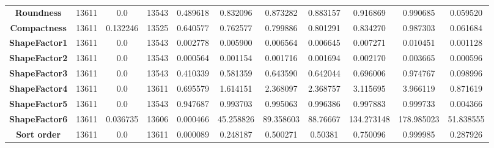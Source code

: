\documentclass[10pt, conference]{IEEEtran}
\begin{document}
\begin{table}[h!]
\begin{center}
\begin{tabular}{|c||c|c|c|c|c|c|c|c|c|c|}
        \textbf{Roundness}          &13611  &0.0       &13543   &0.489618   &0.832096   &0.873282     &0.883157   &0.916869   &0.990685   &0.059520\\
        \textbf{Compactness}        &13611  &0.132246  &13525   &0.640577	&0.762577	&0.799886	  &0.801291	  &0.834270   &0.987303   &0.061684\\
        \textbf{ShapeFactor1}       &13611  &0.0       &13543   &0.002778   &0.005900   &0.006564	  &0.006645   &0.007271   &0.010451   &0.001128\\
        \textbf{ShapeFactor2}       &13611  &0.0       &13543   &0.000564	&0.001154	&0.001716	  &0.001694	  &0.002170   &0.003665   &0.000596\\
        \textbf{ShapeFactor3}       &13611  &0.0       &13543   &0.410339   &0.581359	&0.643590     &0.642044	  &0.696006	  &0.974767   &0.098996\\
        \textbf{ShapeFactor4}       &13611  &0.0       &13611   &0.695579	&1.614151	&2.368097	  &2.368757   &3.115695	  &3.966119   &0.871619\\
        \textbf{ShapeFactor5}       &13611  &0.0       &13543   &0.947687   &0.993703   &0.995063	  &0.996386	  &0.997883   &0.999733   &0.004366\\
        \textbf{ShapeFactor6}       &13611  &0.036735  &13606   &0.000466	&45.258826	&89.358603	  &88.76667   &134.273148 &178.985023 &51.838555\\
        \textbf{Sort order}         &13611  &0.0       &13611   &0.000089   &0.248187   &0.500271     &0.50381    &0.750096   &0.999985   &0.287926\\

        \hline
    \end{tabular}
    \label{tab:continuous features}
    \end{center}
\end{table}
\end{document}
